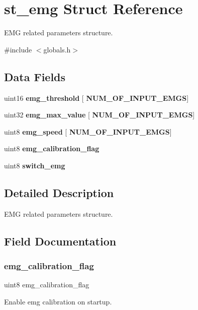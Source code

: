 \section{st\+\_\+emg Struct Reference}
\label{structst__emg}


E\+MG related parameters structure.  




{\ttfamily \#include $<$globals.\+h$>$}

\subsection*{Data Fields}
\begin{DoxyCompactItemize}
\item 
uint16 \textbf{ emg\+\_\+threshold} [\textbf{ N\+U\+M\+\_\+\+O\+F\+\_\+\+I\+N\+P\+U\+T\+\_\+\+E\+M\+GS}]
\item 
uint32 \textbf{ emg\+\_\+max\+\_\+value} [\textbf{ N\+U\+M\+\_\+\+O\+F\+\_\+\+I\+N\+P\+U\+T\+\_\+\+E\+M\+GS}]
\item 
uint8 \textbf{ emg\+\_\+speed} [\textbf{ N\+U\+M\+\_\+\+O\+F\+\_\+\+I\+N\+P\+U\+T\+\_\+\+E\+M\+GS}]
\item 
uint8 \textbf{ emg\+\_\+calibration\+\_\+flag}
\item 
uint8 \textbf{ switch\+\_\+emg}
\end{DoxyCompactItemize}


\subsection{Detailed Description}
E\+MG related parameters structure. 



\subsection{Field Documentation}
\mbox{\label{structst__emg_a78f0b0c6db2a7118cd15ec0aa38ccdb9}} 
\subsubsection{emg\+\_\+calibration\+\_\+flag}
{\footnotesize\ttfamily uint8 emg\+\_\+calibration\+\_\+flag}

Enable emg calibration on startup. \mbox{\label{structst__emg_ad35fe7496b3455cdaf034ddc2c157163}} 
